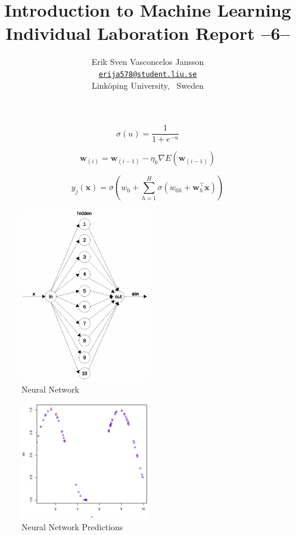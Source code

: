 \documentclass[a4paper, twocolumn]{article}
\title{Introduction to Machine Learning \\
       Individual Laboration Report --6--}
\author{{Erik Sven Vasconcelos Jansson} \\
        {\href{mailto:erija578@student.liu.se}
        {\texttt{erija578@student.liu.se}}} \\
        {Linköping University, \, Sweden}}
\begin{document}
    \maketitle %

    \begin{equation} \label{eq:sigmoid}
        \sigma(u) = \frac{1}{1 + e^{-u}}
    \end{equation}

    \begin{equation} \label{eq:batch_gradient}
        \bm{w}_{(i)} = \bm{w}_{(i-1)} - \eta_k \nabla E(\bm{w}_{(i-1)})
    \end{equation}

    \begin{equation} \label{eq:perceptron}
        y_j(\bm{x}) = \sigma(w_0 + \sum_{h=1}^{H} \sigma(w_{0h} + \bm{w}_h^\intercal\bm{x}))
    \end{equation}

    \begin{figure}[h!]
        \centering
        \caption{Neural Network}
        \label{fig:network}
        \includegraphics[width=0.5\textwidth]{share/network.eps}
    \end{figure}

    \begin{figure}[h!]
        \centering
        \caption{Neural Network Predictions}
        \label{fig:predictions}
        \includegraphics[width=0.5\textwidth]{share/predictions.eps}
    \end{figure}
\end{document}
